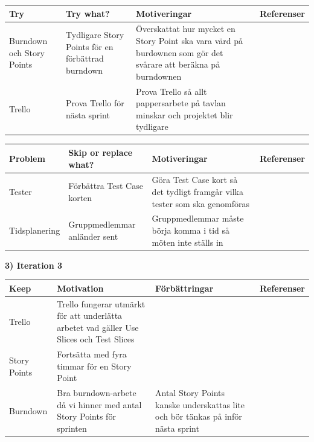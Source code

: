 \documentclass[conference,a4paper]{IEEEtran}
\newcommand\Tstrut{\rule{0pt}{2.6ex}}       %
\newcommand\Bstrut{\rule[-0.9ex]{0pt}{0pt}} %
\newcommand{\TBstrut}{\Tstrut\Bstrut} %
\begin{document}
\begin{table}[H]
	\small
  \centering
	\begin{tabular}{|p{1.5cm}|p{2cm}|p{1.8cm}|p{1.5cm}|} %
    \hline
    Try & Try what? & Motiveringar & Referenser \TBstrut \\
    \hline
    Burndown och Story Points & Tydligare Story Points för en förbättrad burndown & Överskattat hur mycket en Story Point ska vara värd på burdownen som gör det svårare att beräkna på burndownen & \TBstrut \\
    \hline
    Trello & Prova Trello för nästa sprint & Prova Trello så allt pappersarbete på tavlan minskar och projektet blir tydligare & \TBstrut \\
    \hline
  \end{tabular}
\end{table}

\begin{table}[H]
	\small
  \centering
	\begin{tabular}{|p{1.5cm}|p{2cm}|p{1.8cm}|p{1.5cm}|} %
    \hline
    Problem & Skip or replace what? & Motiveringar & Referenser \TBstrut \\
    \hline
    Tester & Förbättra Test Case korten & Göra Test Case kort så det tydligt framgår vilka tester som ska genomföras &\TBstrut \\
    \hline
    Tidsplanering & Gruppmedlemmar anländer sent & Gruppmedlemmar måste börja komma i tid så möten inte ställs in& \TBstrut \\
    \hline
  \end{tabular}
\end{table}

\textbf{3) Iteration 3}

\begin{table}[H]
	\small
  \centering
	\begin{tabular}{|p{1.5cm}|p{2cm}|p{1.8cm}|p{1.5cm}|} %
    \hline
    Keep & Motivation & Förbättringar & Referenser \TBstrut \\
    \hline
    Trello & Trello fungerar utmärkt för att underlätta arbetet vad gäller Use Slices och Test Slices &  &\TBstrut \\
    \hline
    Story Points & Fortsätta med fyra timmar för en Story Point &  & \TBstrut \\
    \hline
    Burndown & Bra burndown-arbete då vi hinner med antal Story Points för sprinten & Antal Story Points kanske underskattas lite och bör tänkas på inför nästa sprint & \TBstrut \\
    \hline
  \end{tabular}
\end{table}
\end{document}
